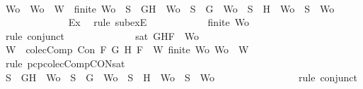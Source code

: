 \begin{isabellebody}
\ \ \ \ \ \ \ \ \ \ \isamarkupfalse%
\ Wo\ \ {\isachardoublequoteopen}Wo\ {\isasymsubseteq}\ W{\isachardoublequoteclose}\ \ {}{\isacharcolon}{\isachardoublequoteopen}finite\ Wo\ {\isasymand}\ {\isacharparenleft}S\ {\isacharequal}\ {\isacharbraceleft}G{\isacharcomma}H{\isacharbraceright}\ {\isasymunion}\ Wo\ {\isasymor}\ S\ {\isacharequal}\ {\isacharbraceleft}G{\isacharbraceright}\ {\isasymunion}\ Wo\ {\isasymor}\ S\ {\isacharequal}\ {\isacharbraceleft}H{\isacharbraceright}\ {\isasymunion}\ Wo\ {\isasymor}\ S\ {\isacharequal}\ Wo{\isacharparenright}{\isachardoublequoteclose}\isanewline
\ \ \ \ \ \ \ \ \ \ \ \ \isamarkupfalse%
\ Ex\ \isamarkupfalse%
\ {\isacharparenleft}rule\ subexE{\isacharparenright}\isanewline
\ \ \ \ \ \ \ \ \ \ \isamarkupfalse%
\ {\isachardoublequoteopen}finite\ Wo{\isachardoublequoteclose}\isanewline
\ \ \ \ \ \ \ \ \ \ \ \ \isamarkupfalse%
\ {}\ \isamarkupfalse%
\ {\isacharparenleft}rule\ conjunct{}{\isacharparenright}\isanewline
\ \ \ \ \ \ \ \ \ \ \ \ \isamarkupfalse%
\ {\isachardoublequoteopen}sat\ {\isacharparenleft}{\isacharbraceleft}G{\isacharcomma}H{\isacharcomma}F{\isacharbraceright}\ {\isasymunion}\ Wo{\isacharparenright}{\isachardoublequoteclose}\ \isanewline
\ \ \ \ \ \ \ \ \ \ \ \ \ \ \isamarkupfalse%
\ {\isacartoucheopen}W\ {\isasymin}\ colecComp{\isacartoucheclose}\ {\isacartoucheopen}Con\ F\ G\ H{\isacartoucheclose}\ {\isacartoucheopen}F\ {\isasymin}\ W{\isacartoucheclose}\ {\isacartoucheopen}finite\ Wo{\isacartoucheclose}\ {\isacartoucheopen}Wo\ {\isasymsubseteq}\ W{\isacartoucheclose}\ \isamarkupfalse%
\ {\isacharparenleft}rule\ pcp{\isacharunderscore}colecComp{\isacharunderscore}CON{\isacharunderscore}sat{\isacharparenright}\isanewline
\ \ \ \ \ \ \ \ \ \ \isamarkupfalse%
\ {\isachardoublequoteopen}S\ {\isacharequal}\ {\isacharbraceleft}G{\isacharcomma}H{\isacharbraceright}\ {\isasymunion}\ Wo\ {\isasymor}\ S\ {\isacharequal}\ {\isacharbraceleft}G{\isacharbraceright}\ {\isasymunion}\ Wo\ {\isasymor}\ S\ {\isacharequal}\ {\isacharbraceleft}H{\isacharbraceright}\ {\isasymunion}\ Wo\ {\isasymor}\ S\ {\isacharequal}\ Wo{\isachardoublequoteclose}\isanewline
\ \ \ \ \ \ \ \ \ \ \ \ \isamarkupfalse%
\ {}\ \isamarkupfalse%
\ {\isacharparenleft}rule\ conjunct{}{\isacharparenright}\isanewline
\ \ \ \ \ \ \ \ \ \ \isamarkupfalse%

\end{isabellebody}
